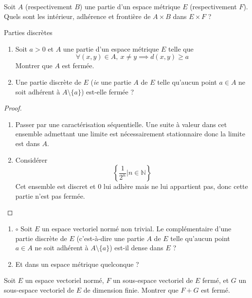 \documentclass[french,a4paper]{article}
\newcommand{\N}{\mathbb{N}}
\theoremstyle{plain}
\theoremstyle{definition}
\theoremstyle{remark}
\begin{document}
\begin{ex}{}
	Soit $A$ (respectivement $B$) une partie d'un espace métrique $E$ (respectivement $F$). Quels sont les intérieur, adhérence et frontière de $A\times B$ dans $E\times F$ ?
\end{ex}

\begin{ex}{Parties discrètes}
	\begin{enumerate}
		\item Soit $a>0$ et $A$ une partie d'un espace métrique $E$ telle que $$\forall(x,y)\in A,\ x\ne y\implies d(x,y)\geqslant a$$ Montrer que $A$ est fermée.
		\item Une partie discrète de $E$ (\textit{ie} une partie $A$ de $E$ telle qu'aucun point $a\in A$ ne soit adhérent à $A\setminus\{a\}$) est-elle fermée ?
	\end{enumerate}
\end{ex}
\begin{proof}
	\begin{enumerate}
		\item Passer par une caractérisation séquentielle. Une suite à valeur dans cet ensemble admettant une limite est nécessairement stationnaire donc la limite est dans $A$.
		\item Considérer $$\left\{\frac{1}{2^n}\bigg|n\in\N\right\}$$ Cet ensemble est discret et $0$ lui adhère mais ne lui appartient pas, donc cette partie n'est pas fermée.
	\end{enumerate}
\end{proof}

\begin{ex}{}
	\begin{enumerate}
		\item $\circ$ Soit $E$ un espace vectoriel normé non trivial. Le complémentaire d'une partie discrète de $E$ (c'est-à-dire une partie $A$ de $E$ telle qu'aucun point $a\in A$ ne soit adhérent à $A\setminus\{a\}$) est-il dense dans $E$ ?
		\item Et dans un espace métrique quelconque ?
	\end{enumerate}
\end{ex}

\begin{ex}[Guindy]{}
	Soit $E$ un espace vectoriel normé, $F$ un sous-espace vectoriel de $E$ fermé, et $G$ un sous-espace vectoriel de $E$ de dimension finie. Montrer que $F+G$ est fermé.
\end{ex}
\end{document}
